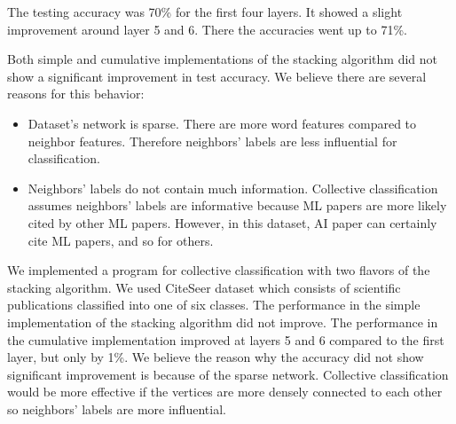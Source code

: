 The testing accuracy was 70\% for the first four layers. It showed a slight improvement around layer 5 and 6. There the accuracies went up to 71\%. 

Both simple and cumulative implementations of the stacking algorithm did not show a significant improvement in test accuracy. We believe there are several reasons for this behavior:
\begin{itemize}
	\item Dataset's network is sparse. There are more word features compared to neighbor features. Therefore neighbors' labels are less influential for classification.
	\item Neighbors' labels do not contain much information. Collective classification assumes neighbors' labels are informative because ML papers are more likely cited by other ML papers. However, in this dataset, AI paper can certainly cite ML papers, and so for others.
\end{itemize}

We implemented a program for collective classification with two flavors of the stacking algorithm. We used CiteSeer dataset which consists of scientific publications classified into one of six classes. The performance in the simple implementation of the stacking algorithm did not improve. The performance in the cumulative implementation improved at layers 5 and 6 compared to the first layer, but only by 1\%. We believe the reason why the accuracy did not show significant improvement is because of the sparse network. Collective classification would be more effective if the vertices are more densely connected to each other so neighbors' labels are more influential.
